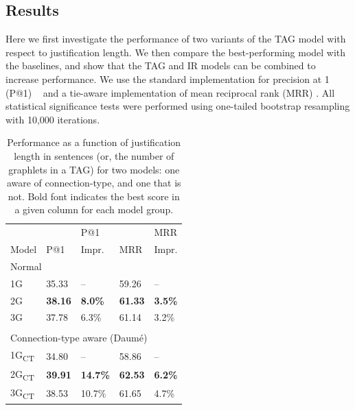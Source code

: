 \subsection{Results}
\label{sec-cl2017:results}

Here we first investigate the performance of two variants of the TAG model with respect to justification length.  We then compare the best-performing model with the baselines, and show that the TAG and IR models can be combined to increase performance. We use the standard implementation for precision at 1 (P@1) ~\citep{manning08} and a tie-aware implementation of mean reciprocal rank (MRR) \citep{mcsherry2008}.  All statistical significance tests were performed using one-tailed bootstrap resampling with 10,000 iterations.



%
%
\begin{table}[t]
\small
\begin{center}
\begin{tabular}{lllll}
\multicolumn{1}{l}{ } & \multicolumn{1}{l}{ } & \multicolumn{1}{l}{P@1} & \multicolumn{1}{l}{ } & \multicolumn{1}{l}{MRR} \\
\multicolumn{1}{l}{ Model } & \multicolumn{1}{l}{P@1} & \multicolumn{1}{l}{Impr.} & \multicolumn{1}{l}{MRR} & \multicolumn{1}{l}{Impr.} \\
\hline
\multicolumn{5}{l}{Normal}\\
\hline
1G					& 35.33			& --				& 59.26  		&	--  \\
2G					& {\bf 38.16}	& {\bf 8.0\%}	& {\bf 61.33}  	&	{\bf 3.5\%}  \\
3G					& 37.78			& 6.3\%			& 61.14  		&	3.2\%  \\
\\
\hline
\multicolumn{5}{l}{Connection-type aware (Daum{\'e})}\\
\hline
1G\textsubscript{CT}			& 34.80			& --				& 58.86  		& --  \\
2G\textsubscript{CT}			& {\bf 39.91}	& {\bf 14.7\%}	& {\bf 62.53}  	& {\bf 6.2\%} \\
3G\textsubscript{CT}			& 38.53			& 10.7\%			& 61.65  		& 4.7\%  \\

\hline
\end{tabular}
\caption{{
Performance as a function of justification length in sentences (or, the number of graphlets in a TAG) for two models: one aware of connection-type, and one that is not. Bold font indicates the best score in a given column for each model group. 
}}
\label{tab:pathlength}
\end{center}
\end{table}


